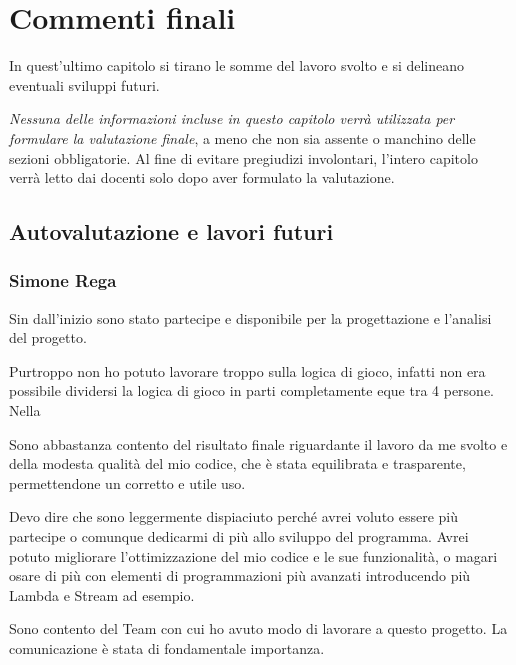 \documentclass[a4paper,12pt]{report}
\begin{document}
\chapter{Commenti finali}

In quest'ultimo capitolo si tirano le somme del lavoro svolto e si delineano eventuali sviluppi
futuri.

\textit{Nessuna delle informazioni incluse in questo capitolo verrà utilizzata per formulare la valutazione finale}, a meno che non sia assente o manchino delle sezioni obbligatorie.
%
Al fine di evitare pregiudizi involontari, l'intero capitolo verrà letto dai docenti solo dopo aver formulato la valutazione.

\section{Autovalutazione e lavori futuri}

\subsection{Simone Rega}
Sin dall'inizio sono stato partecipe e disponibile per la progettazione e l'analisi del progetto. 

Purtroppo non ho potuto lavorare troppo sulla logica di gioco, infatti non era possibile dividersi la logica di gioco in parti completamente eque tra 4 persone. 
Nella 

Sono abbastanza contento del risultato finale riguardante il lavoro da me svolto e della modesta qualità del mio codice, che è stata equilibrata e trasparente, permettendone un corretto e utile uso.

Devo dire che sono leggermente dispiaciuto perché avrei voluto essere più partecipe o comunque dedicarmi di più allo sviluppo del programma. Avrei potuto migliorare l'ottimizzazione del mio codice e le sue funzionalità, o magari osare di più con elementi di programmazioni più avanzati introducendo più Lambda e Stream ad esempio. 

Sono contento del Team con cui ho avuto modo di lavorare a questo progetto. La comunicazione è stata di fondamentale importanza.
\end{document}
